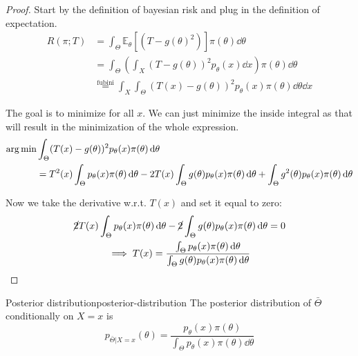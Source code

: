 \documentclass[12pt]{extarticle}
\newcommand{\E}{\mathds{E}}
\begin{document}
\begin{proof}
    Start by the definition of bayesian risk and plug in the definition of expectation.
    \begin{align}
        R(\pi; T) & = \int_\Theta \E_\theta[(T-g(\theta)^2)] \pi(\theta) \dd{\theta}                                              \\
                  & = \int_\Theta \left(\int_X (T-g(\theta))^2 p_\theta(x)\dd{x} \right) \pi(\theta) \dd{\theta}                  \\
                  & \stackrel{\text{fubini}}{=} \int_X \int_\Theta (T(x) - g(\theta))^2 p_\theta(x) \pi(\theta) \dd{\theta}\dd{x}
    \end{align}

    The goal is to minimize for all $x$. We can just minimize the inside integral as that will result in the minimization of the whole expression.
    \begin{align}
        \operatorname*{arg\,min} & \int_\Theta (T(x) - g(\theta))^2 p_\theta(x) \pi(\theta) \dd{\theta}                                                                                                                    \\
                & = T^2(x) \int_\Theta p_\theta(x) \pi(\theta) \dd{\theta}- 2T(x) \int_\Theta g(\theta) p_\theta(x) \pi(\theta) \dd{\theta} + \int_\Theta g^2(\theta) p_\theta(x) \pi(\theta) \dd{\theta}
    \end{align}

    Now we take the derivative w.r.t. $T(x)$ and set it equal to zero:
    \begin{gather}
        \cancel 2 T(x) \int_\Theta p_\theta(x) \pi(\theta) \dd{\theta}- \cancel 2 \int_\Theta g(\theta) p_\theta(x) \pi(\theta) \dd{\theta} = 0 \\
        \implies T(x) = \frac{\int_\Theta p_\theta(x) \pi(\theta) \dd{\theta}}{\int_\Theta g(\theta) p_\theta(x) \pi(\theta) \dd{\theta}}
    \end{gather}
\end{proof}

\begin{definition}{Posterior distribution}{posterior-distribution}
    The posterior distribution of $\bar \Theta$ conditionally on $X = x$ is
    \begin{equation}
        p_{\bar \Theta | X = x} (\theta) = \frac{p_\theta(x) \pi(\theta)}{\int_\Theta p_\theta(x) \pi(\theta) \dd{\theta}}
    \end{equation}
\end{definition}
\end{document}
